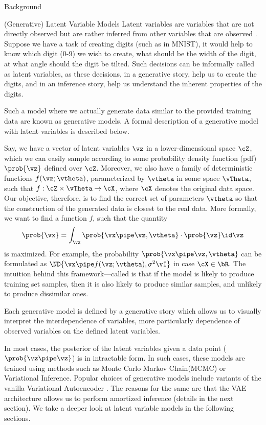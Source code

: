 \documentclass{article}
\begin{document}
\begin{psection}{Background}

	\begin{psubsection}{(Generative) Latent Variable Models}
		Latent variables are variables that are not directly observed but are rather inferred from other variables that are observed \cite{wiki-latent-vars}. Suppose we have a task of creating digits (such as in MNIST), it would help to know which digit (0-9) we wish to create, what should be the width of the digit, at what angle should the digit be tilted. Such decisions can be informally called as latent variables, as these decisions, in a generative story, help us to create the digits, and in an inference story, help us understand the inherent properties of the digits.

		Such a model where we actually generate data similar to the provided training data are known as generative models. A formal description of a generative model with latent variables is described below.

		Say, we have a vector of latent variables $\vz$ in a lower-dimensional space $\cZ$, which we can easily sample according to some probability density function (pdf) $\prob{\vz}$  defined over $\cZ$. Moreover, we also have a family of deterministic functions $f(\vz; \vtheta)$, parameterized by $\vtheta$ in some space $\vTheta$, such that $f : \cZ \times \vTheta \rightarrow \cX$, where $\cX$ denotes the original data space. Our objective, therefore, is to find the correct set of parameters $\vtheta$ so that the construction of the generated data is closest to the real data. More formally, we want to find a function $f$, such that the quantity
		\begin{align*}
			\prob{\vx} = \int_\vz \prob{\vx \pipe \vz, \vtheta} \cdot \prob{\vz} \id\vz
		\end{align*}
		is maximized. For example, the probability $\prob{\vx \pipe \vz, \vtheta}$ can be formulated as $\ND{\vx \pipe f(\vz; \vtheta), \sigma^2 \vI}$ in case $\cX \in \bR $. The intuition behind this framework—called  is that if the model is likely to produce training set samples, then it is also likely to produce similar samples, and unlikely to produce dissimilar ones.

		Each generative model is defined by a generative story which allows us to visually interpret the interdependence of variables, more particularly dependence of observed variables on the defined latent variables.

		In most cases, the posterior of the latent variables given a data point ($\prob{\vz \pipe \vz}$) is in intractable form. In such cases, these models are trained using methods such as Monte Carlo Markov Chain(MCMC) or Variational Inference. Popular choices of generative models include variants of the vanilla Variational Autoencoder \citep{vae}. The reasons for the same are that the VAE architecture allows us to perform amortized inference (details in the next section). We take a deeper look at latent variable models in the following sections.
	\end{psubsection}


\end{psection}
\end{document}
